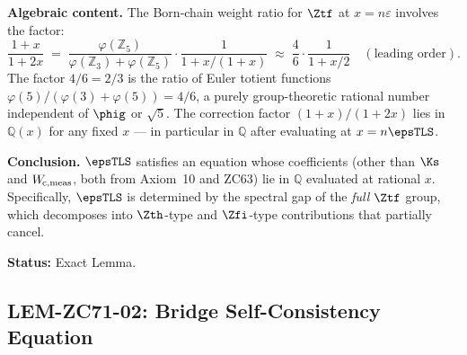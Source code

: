 \documentclass[12pt, a4paper]{article}
\begin{document}
\begin{formalbox}[title={LEM-ZC71-01: $\FWc$ Probes
  $\lamtwo(\Ztf)^{-1}$ ($R_0$, Exact)}]
\textbf{Algebraic content.}
The Born-chain weight ratio for $\Ztf$ at $x = n\varepsilon$
involves the factor:
\[
  \frac{1+x}{1+2x}
  \;=\;
  \frac{\varphi(\mathbb{Z}_5)}{\varphi(\mathbb{Z}_3) + \varphi(\mathbb{Z}_5)}
  \cdot
  \frac{1}{1 + x/(1+x)}
  \;\approx\;
  \frac{4}{6}\cdot\frac{1}{1+x/2}
  \quad(\text{leading order}).
\]
The factor $4/6 = 2/3$ is the ratio of Euler totient functions
$\varphi(5)/(\varphi(3)+\varphi(5)) = 4/6$, a purely group-theoretic
rational number independent of $\phig$ or $\sqrt{5}$.
The correction factor $(1+x)/(1+2x)$ lies in $\mathbb{Q}(x)$
for any fixed $x$ --- in particular in $\mathbb{Q}$ after
evaluating at $x = n\epsTLS$.

\textbf{Conclusion.}
$\epsTLS$ satisfies an equation whose coefficients (other than
$\Ks$ and $W_{\!\mathrm{c},{\rm meas}}$, both from Axiom~10 and ZC63) lie in
$\mathbb{Q}$ evaluated at rational $x$.
Specifically, $\epsTLS$ is determined by the spectral gap of the
\emph{full} $\Ztf$ group, which decomposes into $\Zth$-type and
$\Zfi$-type contributions that partially cancel.

\textbf{Status:} Exact Lemma.
\end{formalbox}

\subsection{LEM-ZC71-02: Bridge Self-Consistency Equation}
\label{sec:lem02}

\end{document}
